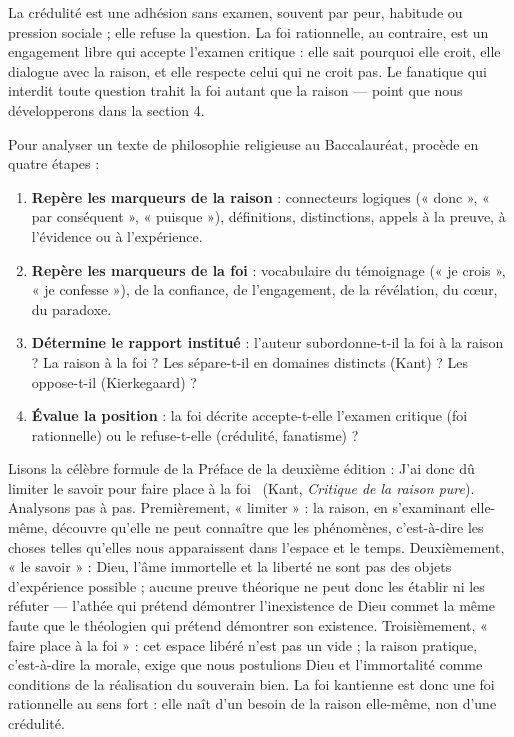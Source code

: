 \documentclass[11pt]{article}
\newcommand{\cle}[1]{{\popxbold\color{popdark}#1}}
\begin{document}
\begin{attention}
La \cle{crédulité} est une adhésion sans examen, souvent par peur, habitude ou pression sociale ; elle refuse la question. La \cle{foi rationnelle}, au contraire, est un engagement libre qui accepte l'examen critique : elle sait pourquoi elle croit, elle dialogue avec la raison, et elle respecte celui qui ne croit pas. Le fanatique qui interdit toute question trahit la foi autant que la raison — point que nous développerons dans la section 4.
\end{attention}

\begin{methode}
Pour analyser un texte de philosophie religieuse au Baccalauréat, procède en quatre étapes :
\begin{enumerate}
  \item \textbf{Repère les marqueurs de la raison} : connecteurs logiques (« donc », « par conséquent », « puisque »), définitions, distinctions, appels à la preuve, à l'évidence ou à l'expérience.
  \item \textbf{Repère les marqueurs de la foi} : vocabulaire du témoignage (« je crois », « je confesse »), de la confiance, de l'engagement, de la révélation, du cœur, du paradoxe.
  \item \textbf{Détermine le rapport institué} : l'auteur subordonne-t-il la foi à la raison ? La raison à la foi ? Les sépare-t-il en domaines distincts (Kant) ? Les oppose-t-il (Kierkegaard) ?
  \item \textbf{Évalue la position} : la foi décrite accepte-t-elle l'examen critique (foi rationnelle) ou le refuse-t-elle (crédulité, fanatisme) ?
\end{enumerate}
\end{methode}

\begin{experience}
Lisons la célèbre formule de la Préface de la deuxième édition : \guillemotleft J'ai donc dû limiter le savoir pour faire place à la foi \guillemotright\ (Kant, \emph{Critique de la raison pure}). Analysons pas à pas. Premièrement, « limiter » : la raison, en s'examinant elle-même, découvre qu'elle ne peut connaître que les phénomènes, c'est-à-dire les choses telles qu'elles nous apparaissent dans l'espace et le temps. Deuxièmement, « le savoir » : Dieu, l'âme immortelle et la liberté ne sont pas des objets d'expérience possible ; aucune preuve théorique ne peut donc les établir ni les réfuter — l'athée qui prétend démontrer l'inexistence de Dieu commet la même faute que le théologien qui prétend démontrer son existence. Troisièmement, « faire place à la foi » : cet espace libéré n'est pas un vide ; la raison pratique, c'est-à-dire la morale, exige que nous postulions Dieu et l'immortalité comme conditions de la réalisation du souverain bien. La foi kantienne est donc une foi rationnelle au sens fort : elle naît d'un besoin de la raison elle-même, non d'une crédulité.
\end{experience}
\end{document}
